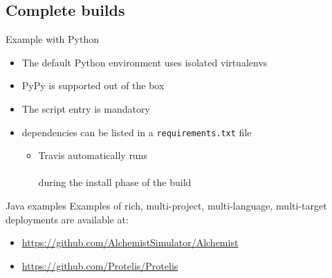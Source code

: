 \documentclass[presentation]{beamer}
\begin{document}
\subsection{Complete builds}

\begin{frame}[fragile]{Example with Python}
    \begin{itemize}
        \item The default Python environment uses isolated virtualenvs
        \item PyPy is supported out of the box
        \item The script entry is mandatory
        \item dependencies can be listed in a \texttt{requirements.txt} file
        \begin{itemize}
            \item Travis automatically runs \\
             ~\\
            during the install phase of the build
        \end{itemize}
    \end{itemize}
\end{frame}

\begin{frame}[fragile]{Java examples}
    Examples of rich, multi-project, multi-language, multi-target deployments are available at:
    \begin{itemize}
        \item \url{https://github.com/AlchemistSimulator/Alchemist}
        \item \url{https://github.com/Protelis/Protelis}
    \end{itemize}
\end{frame}

\section*{\refname}
\begin{frame}[allowframebreaks]
  \frametitle{\refname}
  \scriptsize
  
  
\end{frame}
\section*{\refname}
\end{document}
